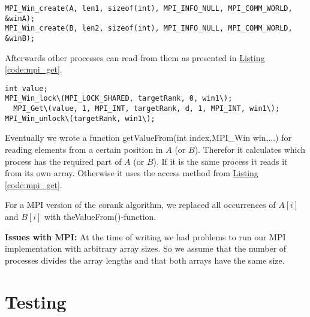 \begin{lstlisting}[caption=window to share arrays, label=code:mpi_window,style=c]
MPI_Win_create(A, len1, sizeof(int), MPI_INFO_NULL, MPI_COMM_WORLD, &winA);
MPI_Win_create(B, len2, sizeof(int), MPI_INFO_NULL, MPI_COMM_WORLD, &winB);
\end{lstlisting}

Afterwards other processes can read from them as presented in \hyperref[code:mpi_get]{Listing \ref*{code:mpi_get}}.

\begin{lstlisting}[caption=window to share arrays, label=code:mpi_get,style=c]
int value;
MPI_Win_lock\(MPI_LOCK_SHARED, targetRank, 0, win1\);
  MPI_Get\(value, 1, MPI_INT, targetRank, d, 1, MPI_INT, win1\);
MPI_Win_unlock\(targetRank, win1\);
\end{lstlisting}

Eventually we wrote a function getValueFrom(int index,MPI\_Win win,...) for reading elements from a certain position in $A$ (or $B$).
Therefor it calculates which process has the required part of $A$ (or $B$).
If it is the same process it reads it from its own array.
Otherwise it uses the access method from \hyperref[code:mpi_get]{Listing \ref*{code:mpi_get}}.

For a MPI version of the corank algorithm, we replaced all occurrences of $A[i]$ and $B[i]$ with theValueFrom()-function.


\textbf{Issues with MPI:}
At the time of writing we had problems to run our MPI implementation with arbitrary array sizes.
So we assume that the number of processes divides the array lengths and that both arrays have the same size.
\section{Testing}

